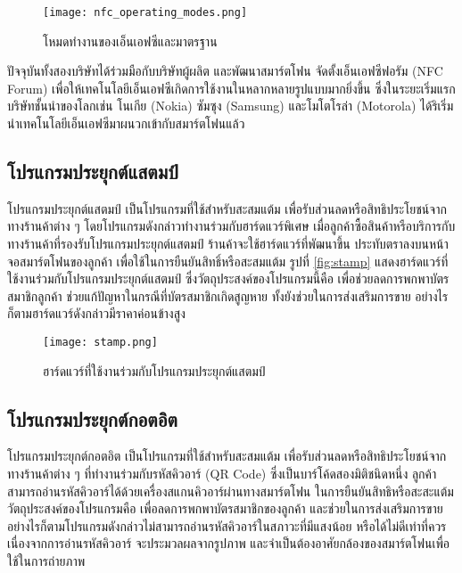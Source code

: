 \documentclass[a4paper]{article}
\begin{document}
\begin{figure}[ht!]
\centering
\texttt{[image: nfc\_operating\_modes.png]}
\caption{โหมดทำงานของเอ็นเอฟซีและมาตรฐาน} \label{fig:nfc}
\label{overflow}
\end{figure}

ปัจจุบันทั้งสองบริษัทได้ร่วมมือกับบริษัทผู้ผลิต และพัฒนาสมาร์ตโฟน จัดตั้งเอ็นเอฟซีฟอรัม (NFC Forum) เพื่อให้เทคโนโลยีเอ็นเอฟซีเกิดการใช้งานในหลากหลายรูปแบบมากยิ่งขึ้น ซึ่งในระยะเริ่มแรกบริษัทชั้นนำของโลกเช่น โนเกีย (Nokia) ซัมซุง (Samsung) และโมโตโรล่า (Motorola) ได้ริเริ่มนำเทคโนโลยีเอ็นเอฟซีมาผนวกเข้ากับสมาร์ตโฟนแล้ว

\subsection{โปรแกรมประยุกต์แสตมป์}
โปรแกรมประยุกต์แสตมป์ เป็นโปรแกรมที่ใช้สำหรับสะสมแต้ม เพื่อรับส่วนลดหรือสิทธิประโยชน์จากทางร้านค้าต่าง ๆ โดยโปรแกรมดังกล่าวทำงานร่วมกับฮาร์ดแวร์พิเศษ เมื่อลูกค้าซื้อสินค้าหรือบริการกับทางร้านค้าที่รองรับโปรแกรมประยุกต์แสตมป์ ร้านค้าจะใช้ฮาร์ดแวร์ที่พัฒนาขึ้น ประทับตราลงบนหน้าจอสมาร์ตโฟนของลูกค้า เพื่อใช้ในการยืนยันสิทธิ์หรือสะสมแต้ม รูปที่ \ref{fig:stamp} แสดงฮาร์ดแวร์ที่ใช้งานร่วมกับโปรแกรมประยุกต์แสตมป์ ซึ่งวัตถุประสงค์ของโปรแกรมนี้คือ เพื่อช่วยลดการพกพาบัตรสมาชิกลูกค้า ช่วยแก้ปัญหาในกรณีที่บัตรสมาชิกเกิดสูญหาย ทั้งยังช่วยในการส่งเสริมการขาย อย่างไรก็ตามฮาร์ดแวร์ดังกล่าวมีราคาค่อนข้างสูง

\begin{figure}[ht!]
\centering
\texttt{[image: stamp.png]}
\caption{ฮาร์ดแวร์ที่ใช้งานร่วมกับโปรแกรมประยุกต์แสตมป์} \label{fig:stamp}
\label{overflow}
\end{figure}

\subsection{โปรแกรมประยุกต์กอตอิต}
โปรแกรมประยุกต์กอตอิต เป็นโปรแกรมที่ใช้สำหรับสะสมแต้ม เพื่อรับส่วนลดหรือสิทธิประโยชน์จากทางร้านค้าต่าง ๆ ที่ทำงานร่วมกับรหัสคิวอาร์ (QR Code) ซึ่งเป็นบาร์โค้ดสองมิติชนิดหนึ่ง ลูกค้าสามารถอ่านรหัสคิวอาร์ได้ด้วยเครื่องสแกนคิวอาร์ผ่านทางสมาร์ตโฟน ในการยืนยันสิทธิหรือสะสะแต้ม วัตถุประสงค์ของโปรแกรมคือ เพื่อลดการพกพาบัตรสมาชิกของลูกค้า และช่วยในการส่งเสริมการขาย  อย่างไรก็ตามโปรแกรมดังกล่าวไม่สามารถอ่านรหัสคิวอาร์ในสภาวะที่มีแสงน้อย หรือได้ไม่ดีเท่าที่ควร เนื่องจากการอ่านรหัสคิวอาร์ จะประมวลผลจากรูปภาพ และจำเป็นต้องอาศัยกล้องของสมาร์ตโฟนเพื่อใช้ในการถ่ายภาพ

\end{document}
